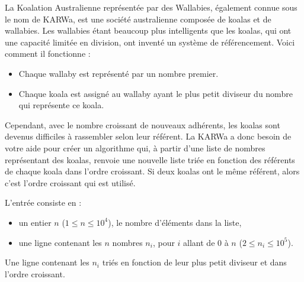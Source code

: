 \problemname{\problemyamlname}

La Koalation Australienne représentée par des Wallabies, également connue sous le nom de KARWa, est une société australienne composée de koalas et de wallabies. Les wallabies étant beaucoup plus intelligents que les koalas, qui ont une capacité limitée en division, ont inventé un système de référencement. Voici comment il fonctionne :

\begin{itemize}
	\item Chaque wallaby est représenté par un nombre premier.
	\item Chaque koala est assigné au wallaby ayant le plus petit diviseur du nombre qui représente ce koala.
\end{itemize}
Cependant, avec le nombre croissant de nouveaux adhérents, les koalas sont devenus difficiles à rassembler selon leur référent. La KARWa a donc besoin de votre aide pour créer un algorithme qui, à partir d'une liste de nombres représentant des koalas, renvoie une nouvelle liste triée en fonction des référents de chaque koala dans l'ordre croissant. Si deux koalas ont le même référent, alors c'est l'ordre croissant qui est utilisé.

\begin{Input}
	L'entrée consiste en :
	\begin{itemize}
		\item un entier $n$ ($1 \leq n \leq 10^4$), le nombre d'éléments dans la liste,
		\item une ligne contenant les $n$ nombres $n_i$, pour $i$ allant de $0$ à $n$ ($2 \leq n_i \leq 10^5$).
	\end{itemize}
\end{Input}

\begin{Output}
	Une ligne contenant les $n_i$ triés en fonction de leur plus petit diviseur et dans l'ordre croissant.
\end{Output}
